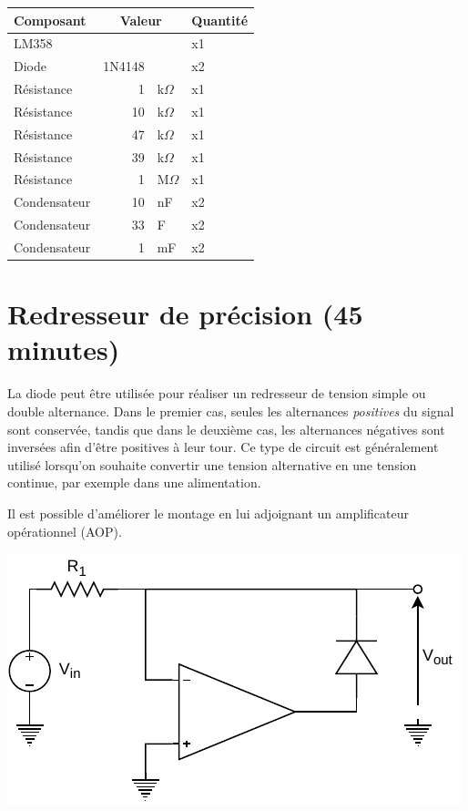 \documentclass{../template/labo}
\begin{document}
\begin{center}
	\begin{tabular}{p{}rlp{}}
		Composant & \multicolumn{2}{c}{Valeur} & Quantité \\\toprule
		\multirow{1}{*}{LM358} &  & & x1 \\\midrule
		\multirow{1}{*}{Diode} & 1N4148 & & x2 \\\midrule
		\multirow{1}{*}{Résistance} 	& 1 & k$\Omega$ & x1 \\\midrule
		\multirow{1}{*}{Résistance} 	& 10 & k$\Omega$ & x1 \\\midrule
		\multirow{1}{*}{Résistance} 	& 47 & k$\Omega$ & x1 \\\midrule
		\multirow{1}{*}{Résistance} 	& 39 & k$\Omega$ & x1 \\\midrule
		\multirow{1}{*}{Résistance} 	& 1 & M$\Omega$ & x1 \\\midrule
		\multirow{1}{*}{Condensateur} 	& 10 & nF & x2 \\\midrule
		\multirow{1}{*}{Condensateur} 	& 33 & \textmu F & x2 \\\midrule
		\multirow{1}{*}{Condensateur} 	& 1 & mF & x2 \\\bottomrule
	\end{tabular}
\end{center}

\section{Redresseur de précision (45 minutes)}
La diode peut être utilisée pour réaliser un redresseur de tension simple ou double alternance.
Dans le premier cas, seules les alternances \textit{positives} du signal sont conservée, tandis que dans le deuxième cas, les alternances négatives sont inversées afin d'être positives à leur tour.
Ce type de circuit est généralement utilisé lorsqu'on souhaite convertir une tension alternative en une tension continue, par exemple dans une alimentation.

Il est possible d'améliorer le montage en lui adjoignant un amplificateur opérationnel (AOP).
\begin{center}
	\includegraphics[width=.7\textwidth]{precision-rectifier.pdf}
\end{center}
\end{document}

